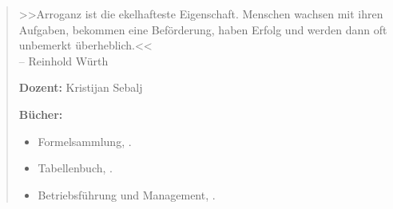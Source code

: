 \null\vfil
\begin{otherlanguage}{ngerman}
\begin{center}\textsf{\textbf{\abstractname}}\end{center}


    \begin{quote}
        \textcolor{rot5}{>>Arroganz ist die ekelhafteste Eigenschaft. 
        Menschen wachsen mit ihren Aufgaben, bekommen eine Beförderung, 
        haben Erfolg und werden dann oft unbemerkt überheblich.<<}\\ 
        \raggedleft \small{-- Reinhold Würth}%
        
        \raggedright
        \textbf{Dozent:} Kristijan Sebalj

        \textbf{Bücher:}

        \begin{itemize}      
            \item Formelsammlung, \textcite{bell:2020:formelsammlung}.
            \item Tabellenbuch, \textcite{bell:2021:tabellenbuchKfz}.
            \item Betriebsführung und Management, \textcite{heiser:2017:betriebsfuhrung}.
        \end{itemize}


    \end{quote}

\end{otherlanguage}
\vfil\null



